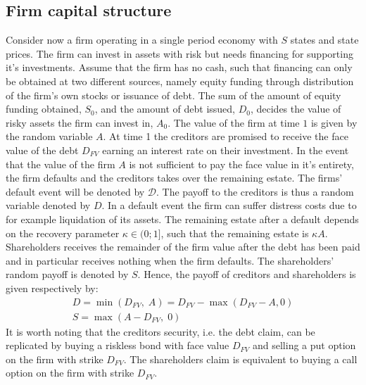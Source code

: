 \documentclass[../main.tex]{subfiles}
\begin{document}
    \subsection{Firm capital structure}
        Consider now a firm operating in a single period economy with $S$ states and state prices.
        The firm can invest in assets with risk but needs financing for supporting it's investments.
        Assume that the firm has no cash, such that financing can only be obtained at two different sources, namely equity funding through distribution of the firm's own stocks or issuance of debt.
        The sum of the amount of equity funding obtained, $S_{0}$, and the amount of debt issued, $D_{0}$, decides the value of risky assets the firm can invest in, $A_{0}$.
        The value of the firm at time $1$ is given by the random variable $A$.
        At time 1 the creditors are promised to receive the face value of the debt $D_{FV}$ earning an interest rate on their investment.
        In the event that the value of the firm $A$ is not sufficient to pay the face value in it's entirety, the firm defaults and the creditors takes over the remaining estate. 
        The firms' default event will be denoted by $\mathcal{D}$.
        The payoff to the creditors is thus a random variable denoted by $D$.
        In a default event the firm can suffer distress costs due to for example liquidation of its assets.
        The remaining estate after a default depends on the recovery parameter $\kappa \in (0;1]$, such that the remaining estate is $\kappa A$.
        Shareholders receives the remainder of the firm value after the debt has been paid and in particular receives nothing when the firm defaults.
        The shareholders' random payoff is denoted by $S$.
        Hence, the payoff of creditors and shareholders is given respectively by:
            \begin{gather}
                D = \min\left(
                        D_{FV},\; A
                    \right)
                    = D_{FV} - \max\left(
                        D_{FV} - A, 0
                    \right) \label{eqn:legacy-creditor-payoff}\\
                S
                    = \max\left(
                        A - D_{FV},\; 0
                    \right)
            \end{gather}
        It is worth noting that the creditors security, i.e. the debt claim, can be replicated by buying a riskless bond with face value $D_{FV}$ and selling a put option on the firm with strike $D_{FV}$.
        The shareholders claim is equivalent to buying a call option on the firm with strike $D_{FV}$.
\end{document}
